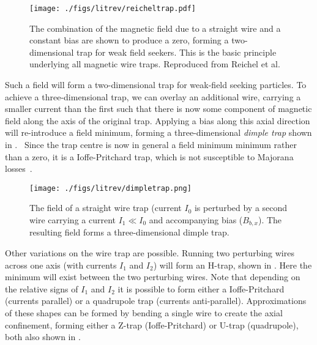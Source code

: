 \begin{figure}
  \texttt{[image: ./figs/litrev/reicheltrap.pdf]}
  \caption{The combination of the magnetic field due to a straight wire and a
  constant bias are shown to produce a zero, forming a two-dimensional trap for
  weak field seekers. This is the basic principle underlying all magnetic wire
  traps. Reproduced from Reichel et al.~\cite{Reichel1999}
  }
  \label{litrev:fig:reicheltrap}
\end{figure}

Such a field will form a two-dimensional trap for weak-field seeking particles.
To achieve a three-dimensional trap, we can overlay an additional wire,
carrying a smaller current than the first such that there is now some component
of magnetic field along the axis of the original trap. Applying a bias along
this axial direction will re-introduce a field minimum, forming a three-dimensional
\emph{dimple trap} shown in .~\cite{2011Ac}
Since the trap centre is now in general a field minimum minimum rather than a
zero, it is a Ioffe-Pritchard trap, which is not susceptible to Majorana
losses~\cite{PhysRevLett.51.1336}.

\begin{figure}
  \texttt{[image: ./figs/litrev/dimpletrap.png]}
  \caption{The field of a straight wire trap (current $I_0$ is perturbed by a
  second wire carrying a current $I_1 \ll I_0 $ and accompanying bias
  ($B_{b,x}$). The resulting field forms a three-dimensional dimple trap.
  }
  \label{litrev:fig:dimpletrap}
\end{figure}

Other variations on the wire trap are possible. Running two perturbing wires
across one axis (with currents $I_1$ and $I_2$) will form an H-trap, shown in
. Here the minimum will exist between the
two perturbing wires. Note that depending on the relative signs of $I_1$ and
$I_2$ it is possible to form either a Ioffe-Pritchard (currents parallel) or a
quadrupole trap (currents anti-parallel). Approximations of these shapes can be
formed by bending a single wire to create the axial confinement, forming either
a Z-trap (Ioffe-Pritchard) or U-trap (quadrupole), both also shown in
. 

